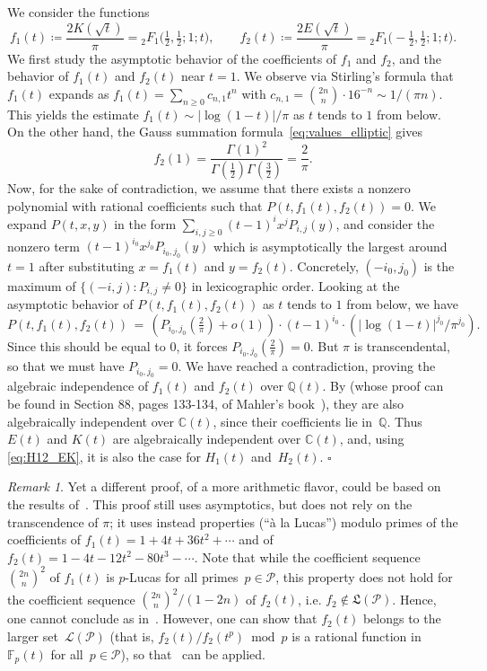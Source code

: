 \documentclass[12pt]{amsart}
\theoremstyle{plain}
\theoremstyle{remark}
\newtheorem{remark}[lemma]{Remark}
\def\Q{\mathbb{Q}}
\def\Q{\mathbb{Q}}
\begin{document}
We consider the functions
\[f_1(t) \coloneqq \frac{2K(\sqrt t)}{\pi} = {}_{2}^{}{{}{{}{F_{1}^{}}}}\big(\tfrac12, \tfrac12; 1; t\big),
\qquad f_2(t) \coloneqq \frac{2E(\sqrt t)}{\pi} = {}_{2}^{}{{}{{}{F_{1}^{}}}}\big(-\tfrac12, \tfrac12; 1; t\big).\]
We first study the asymptotic behavior of the coefficients of $f_1$ and $f_2$,
and the behavior of $f_1(t)$ and $f_2(t)$ near $t=1$. 
We observe via Stirling's formula that $f_1(t)$ expands as
$f_1(t)=\sum_{n \ge 0} c_{n,1} t^n$ with $c_{n,1} = \binom{2n}{n} \cdot 16^{-n}  \sim 1/(\pi n)$.
This yields the estimate $f_1(t) \sim |\log(1-t)|/\pi $ as $t$ tends to $1$ from below.
On the other hand, the Gauss summation formula~\eqref{eq:values_elliptic} gives
\[f_2(1)=\frac{\Gamma(1)^2}{\Gamma(\tfrac12) \Gamma(\tfrac32)}=\frac{2}{\pi}.\]
Now, for the sake of contradiction, we assume that there exists a nonzero polynomial  with rational coefficients such that $P(t,f_1(t),f_2(t))=0$. 
We expand $P(t,x,y)$ in the form $\sum_{i,j \ge 0} (t-1)^i x^j P_{i,j}(y)$,
and consider the nonzero term $(t-1)^{i_0} x^{j_0} P_{i_0,j_0}(y)$
which is asymptotically the largest around $t=1$ after substituting $x=f_1(t)$ and $y=f_2(t)$.
Concretely, $(-i_0,j_0)$ is the maximum of $\{(-i,j) : P_{i,j}\ne 0\}$
 in lexicographic order.
 Looking at the asymptotic behavior of $P(t,f_1(t),f_2(t))$ as $t$ tends to $1$
from below, we have 
\[ P(t,f_1(t),f_2(t))\, = \, (P_{i_0,j_0}(\tfrac2{\pi})+o(1))\cdot (t-1)^{i_0} \cdot ( |\log(1-t)|^{j_0}/\pi^{j_0}).\]
Since this should be equal to $0$, it forces $P_{i_0,j_0}(\tfrac2{\pi})=0$.
But $\pi$ is transcendental, so that we must have $P_{i_0,j_0} = 0$.
We have reached a contradiction, proving the algebraic independence of $f_1(t)$ and $f_2(t)$ over $\mathbb Q(t)$.
% 
By \cite[Lemma 7.2]{ABD19} (whose proof can be found in Section 88, pages 133-134, of Mahler's book~\cite{Mahler76}), they are also algebraically independent over $\mathbb C(t)$, since their coefficients lie in~$\Q$.
Thus $E(t)$ and $K(t)$ are
algebraically independent over $\mathbb C(t)$,
and, using \eqref{eq:H12_EK}, it is also the case for $H_1(t)$ and~$H_2(t)$.
\hfill $\square$

\begin{remark}
Yet a different proof, of a more arithmetic flavor, could be based on the results of~\cite{ABD19}. 
This proof still uses asymptotics, but does not rely on the transcendence of $\pi$; it uses instead properties (``à la Lucas'') modulo primes of the coefficients of 
$f_1(t) 
= 1+4 t +36 t^{2}+\cdots$ and of 
$f_2(t) 
= 1-4 t -12 t^{2}-80 t^{3}-\cdots$.
Note that while the coefficient sequence $\binom{2n}{n}^2$ of $f_1(t)$ is $p$-Lucas for all primes~$p\in\mathcal{P}$, this property does not hold for the coefficient sequence $\binom{2n}{n}^2/(1-2n)$ of $f_2(t)$, i.e. $f_2 \notin{\mathfrak{L}(\mathcal{P})}$. Hence, one cannot conclude as in~\cite[Theorem~7.7]{ABD19}. However, one can show that $f_2(t)$ belongs to the larger set~${\mathcal{L}(\mathcal{P})}$ (that is, $f_2(t)/f_2(t^p)\bmod p$ is a rational function in $\mathbb{F}_p(t)$ for all~$p\in\mathcal{P}$), so that~\cite[Proposition~7.6]{ABD19} can be applied.
\end{remark}
\end{document}
